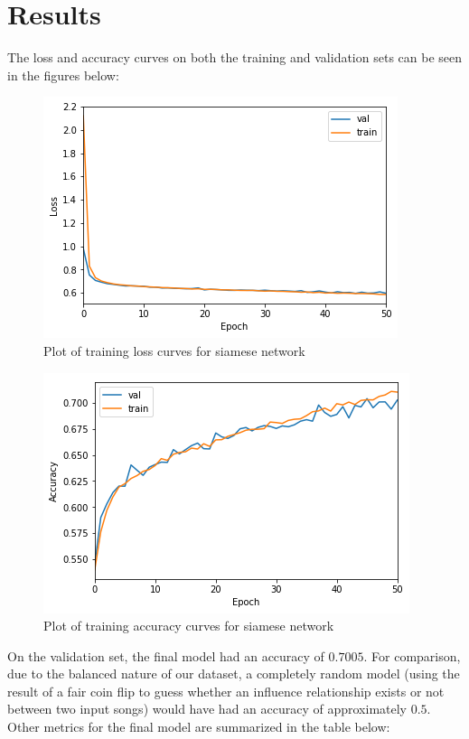 \section{Results}
The loss and accuracy curves on both the training and validation sets can be seen in the figures below:

\begin{figure}[H]
\includegraphics[width=\textwidth]{figures/loss.png}
\caption{Plot of training loss curves for siamese network}
\end{figure}

\begin{figure}[H]
\includegraphics[width=\textwidth]{figures/accuracy.png}
\caption{Plot of training accuracy curves for siamese network}
\end{figure}

On the validation set, the final model had an accuracy of $0.7005$. For comparison, due to the balanced nature of our dataset, a completely random model (using the result of a fair coin flip to guess whether an influence relationship exists or not between two input songs) would have had an accuracy of approximately $0.5$. Other metrics for the final model are summarized in the table below:

